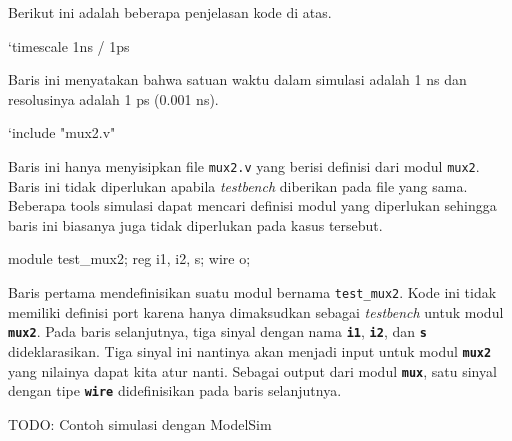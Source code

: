 Berikut ini adalah beberapa penjelasan kode di atas.

\begin{verilogcode}
`timescale 1ns / 1ps
\end{verilogcode}
Baris ini menyatakan bahwa satuan waktu dalam simulasi adalah 1 ns dan
resolusinya adalah 1 ps (0.001 ns).

\begin{verilogcode}
`include "mux2.v"
\end{verilogcode}
Baris ini hanya menyisipkan file {\tt mux2.v} yang berisi definisi dari modul {\tt mux2}.
Baris ini tidak diperlukan apabila \textit{testbench} diberikan pada file yang sama.
Beberapa tools simulasi dapat mencari definisi modul yang diperlukan sehingga
baris ini biasanya juga tidak diperlukan pada kasus tersebut.

\begin{verilogcode}
module test_mux2;
  reg i1, i2, s;
  wire o;
\end{verilogcode}

Baris pertama mendefinisikan suatu modul bernama {\tt\small test\_mux2}. Kode
ini tidak memiliki definisi port karena hanya dimaksudkan sebagai {\it testbench}
untuk modul {\tt\textbf{mux2}}. Pada baris selanjutnya,
tiga sinyal dengan nama {\tt\textbf{i1}}, {\tt\textbf{i2}},
dan {\tt\textbf{s}} dideklarasikan. Tiga sinyal ini nantinya akan menjadi input untuk
modul {\tt\textbf{mux2}}
yang nilainya dapat kita atur nanti.
Sebagai output dari modul {\tt\textbf{mux}}, satu sinyal dengan tipe {\tt\textbf{wire}}
didefinisikan pada baris selanjutnya.



{\color{red} TODO: Contoh simulasi dengan ModelSim}
